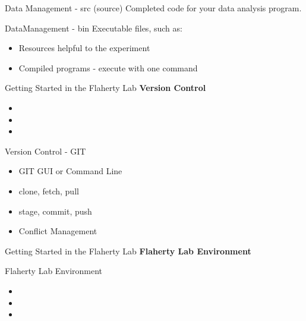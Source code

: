 \documentclass{beamer}
\begin{document}
\begin{frame}{Data Management - src (source)}
	\LARGE{Completed code for your data analysis program.}
\end{frame}

\begin{frame}{DataManagement - bin}
	\LARGE{Executable files, such as:}
		\begin{itemize}
	\item\LARGE{Resources helpful to the experiment}
	\item{Compiled programs - execute with one command}
		\end{itemize}
\end{frame}

\begin{frame}{Getting Started in the Flaherty Lab}
\LARGE\textbf{Version Control}
	\begin{itemize}
  \item\LARGE {}
  \item\LARGE {}
  \item\LARGE {}
	\end{itemize}
\end{frame}

\begin{frame}{Version Control - GIT}
	\begin{itemize}
  \item\LARGE{GIT GUI or Command Line}
  \item\LARGE{clone, fetch, pull}
  \item\LARGE{stage, commit, push}
  \item\LARGE{Conflict Management}
	\end{itemize}
\end{frame}

\begin{frame}{Getting Started in the Flaherty Lab}
\LARGE\textbf{Flaherty Lab Environment}
\end{frame}

\begin{frame}{Flaherty Lab Environment}
          \begin{itemize}
  \item\LARGE {}
  \item\LARGE {}
  \item\LARGE {}
	\end{itemize}
\end{frame}
\end{document}
